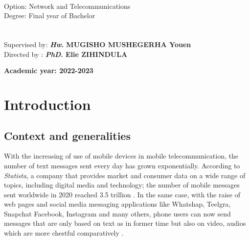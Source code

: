 \documentclass[12pt,a4paper]{report}
\begin{document}
\begin{titlepage}
\begin {minipage}{0.5 \textwidth }
\begin{flushright}
{\begin{tabbing}
				\vspace*{0.3cm}\\
				\hspace*{2cm} Option: Network and Telecommunications\\					
				\hspace*{2cm} Degree: Final year of Bachelor\\ 
				\vspace*{2cm}\\
				\\
				\hspace*{2cm}Supervised by: \textbf{\textit{Hw}. MUGISHO MUSHEGERHA Youen }\\
				\hspace*{2cm}Directed by : \textbf{\textit{PhD}. Elie ZIHINDULA}			
			\end{tabbing}
		}					

	\end{flushright}
\end{minipage}
\begin{center}
\end{center}

\begin{center} 
	\huge{\textbf{Academic year: 2022-2023}}
\end{center}
\end{titlepage} 
	\tableofcontents 
	\listoffigures
	\listoftables
	
	\newpage
	

	\chapter*{Introduction}
	\section{Context and generalities} 
	With the increasing of use of mobile devices in mobile telecommunication, the number of text messages sent every day has grown exponentially. According to \textit{Statista}, a company that provides market and consumer data on a wide range of topics, including digital media and technology; the number of mobile messages sent worldwide in 2020 reached 3.5 trillion \cite{Statista2020}. 
	In the same case, with the raise of web pages and social media messaging applications like Whatshap, Teelgra, Snapchat Facebook, Instagram and many others, phone users can now send messages  that are only based on text as in former time but also on video, audios which are more chestful comparatively \cite{faklaris2016oh}. \\
	
\end{document}
